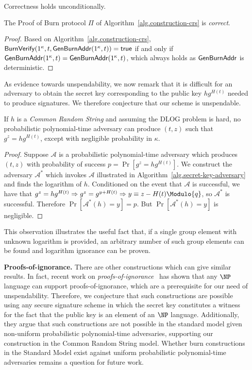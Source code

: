 Correctness holds unconditionally.

\begin{theorem}[Correctness]
  The Proof of Burn protocol $\Pi$ of Algorithm~\ref{alg.construction-crs} is \emph{correct}.
\end{theorem}
\begin{proof}
  Based on Algorithm~\ref{alg.construction-crs}, $\mathsf{BurnVerify}(1^\kappa, t, \mathsf{Gen}\-\mathsf{Burn}\-\mathsf{Addr}(1^\kappa, t)) = \textsf{true}$ if and only if $\mathsf{Gen}\-\mathsf{Burn}\-\mathsf{Addr}(1^\kappa, t) = \mathsf{Gen}\-\mathsf{Burn}\-\mathsf{Addr}(1^\kappa, t)$, which always holds as $\mathsf{Gen}\-\mathsf{Burn}\-\mathsf{Addr}$ is deterministic.
\end{proof}

As evidence towards unspendability, we now remark that it is difficult for an adversary to obtain the secret key corresponding to the public key $h g^{H(t)}$ needed to produce signatures. We therefore conjecture that our scheme is unspendable.

\begin{lemma}
  If $h$ is a \emph{Common Random String} and assuming the DLOG problem is hard, no probabilistic polynomial-time adversary can produce $(t, z)$ such that $g^z = h g^{H(t)}$, except with negligible probability in $\kappa$.
\end{lemma}
\begin{proof}
  Suppose $\mathcal{A}$ is a probabilistic polynomial-time adversary which produces $(t, z)$ with probability of success $p = \Pr[g^z = h g^{H(t)}]$.
  We construct the adversary $\mathcal{A}^*$ which invokes $\mathcal{A}$
  illustrated in Algorithm~\ref{alg.secret-key-adversary} and finds the
  logarithm of $h$.
  Conditioned on the event that $\mathcal{A}$ is successful,
  we have that
  $g^z = h g^{H(t)} \Rightarrow g^z = g^{y + H(t)} \Rightarrow y \equiv z - H(t) \Modulo{q}$, so $\mathcal{A}^*$ is successful.
  Therefore $\Pr[\mathcal{A}^*(h) = y] = p$.
  But $\Pr[\mathcal{A}^*(h) = y]$ is negligible.
\end{proof}

This observation illustrates the useful fact that, if a single group element with unknown logarithm is provided, an arbitrary number of such group elements can be found and logarithm ignorance can be proven.

\noindent\textbf{Proofs-of-ignorance.}
There are other constructions which can give similar results. In fact, recent
work on \emph{proofs-of-ignorance}~\cite{deshpande2018proofs} has shown that any
$\NP$ language can support proofs-of-ignorance, which are a prerequisite for our
need of unspendability. Therefore, we conjecture that such constructions
are possible using any secure signature scheme in which the secret key
constitutes a witness for the fact that the public key is an element of an $\NP$
language. Additionally, they argue that such constructions are not possible in
the standard model given non-uniform probabilistic polynomial-time adversaries,
supporting our construction in the Common Random String model. Whether burn
constructions in the Standard Model exist against uniform probabilistic
polynomial-time adversaries remains a question for future work.

